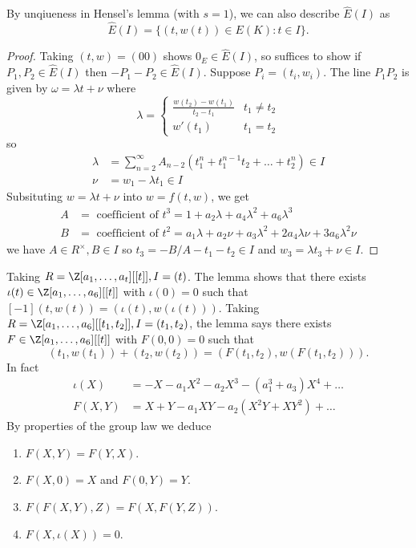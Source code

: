 \documentclass[a4paper]{article}
\theoremstyle{definition}
\begin{document}
\begin{remark}
  By unqiueness in Hensel's lemma (with \(s = 1\)), we can also describe \(\hat E(I)\) as
  \[
    \hat E(I) = \{(t, w(t)) \in E(K): t \in I\}.
  \]
\end{remark}

\begin{proof}
  Taking \((t, w) = (0 0)\) shows \(0_E \in \hat E(I)\), so suffices to show if \(P_1, P_2 \in \hat E(I)\) then \(-P_1 - P_2 \in \hat E(I)\). Suppose \(P_i = (t_i, w_i)\). The line \(P_1P_2\) is given by \(\omega = \lambda t + \nu\) where
  \[
    \lambda =
    \begin{cases}
      \frac{w(t_2) - w(t_1)}{t_2 - t_1} & t_1 \neq t_2 \\
      w'(t_1) & t_1 = t_2
    \end{cases}
  \]
  so
  \begin{align*}
    \lambda &= \sum_{n = 2}^\infty A_{n - 2}(t_1^n + t_1^{n - 1}t_2 + \dots + t_2^n) \in I \\
    \nu &= w_1 - \lambda t_1 \in I
  \end{align*}
  Subsituting \(w = \lambda t + \nu\) into \(w = f(t, w)\), we get
  \begin{align*}
    A &= \text{ coefficient of } t^3 = 1 + a_2 \lambda + a_4 \lambda^2 + a_6 \lambda^3 \\
    B &= \text{ coefficient of } t^2 = a_1 \lambda + a_2 \nu + a_3 \lambda^2 + 2a_4 \lambda \nu + 3a_6 \lambda^2 \nu
  \end{align*}
  we have \(A \in R^\times, B \in I\) so \(t_3 = -B/A - t_1 - t_2 \in I\) and \(w_3 = \lambda t_3 + \nu \in I\).
\end{proof}

Taking \(R = \Z[a_1, \dots, a_t][[t]], I = (t)\). The lemma shows that there exists \(\iota(t) \in \Z[a_1, \dots, a_6][[t]]\) with \(\iota(0) = 0\) such that \([-1] (t, w(t)) = (\iota(t), w(\iota(t)))\). Taking \(R = \Z[a_1, \dots, a_6][[t_1, t_2]], I = (t_1, t_2)\), the lemma says there exists \(F \in \Z[a_1, \dots, a_6][[t]]\) with \(F(0, 0) = 0\) such that
\[
  (t_1, w(t_1)) + (t_2, w(t_2)) = (F(t_1, t_2), w(F(t_1, t_2))).
\]
In fact
\begin{align*}
  \iota(X) &= - X - a_1X^2 - a_2X^3 - (a_1^3 + a_3) X^4 + \dots \\
  F(X, Y) &= X + Y - a_1XY - a_2(X^2Y + XY^2) + \dots
\end{align*}
By properties of the group law we deduce
\begin{enumerate}
\item \(F(X, Y) = F(Y, X)\).
\item \(F(X, 0) = X\) and \(F(0, Y) = Y\).
\item \(F(F(X, Y), Z) = F(X, F(Y, Z))\).
\item \(F(X, \iota(X)) = 0\).
\end{enumerate}
\end{document}
